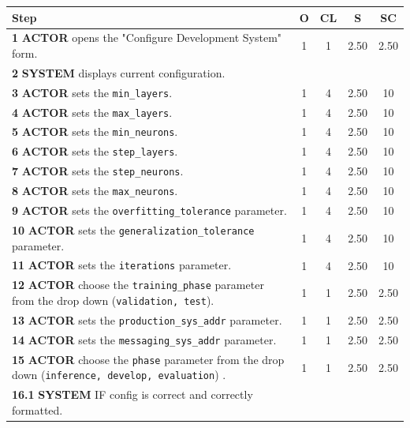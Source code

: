 \begin{table}[H]
    \centering
    \begin{tabularx}{\textwidth}{|X|c|c|c|c|}
    \hline
    \textbf{Step} & \textbf{O} & \textbf{CL} & \textbf{S} & \textbf{SC} \\
    \hline
    \textbf{1} \textbf{ACTOR} opens the "Configure Development System" form. & 1 & 1 & 2.50 & 2.50\\
    \hline
    \textbf{2} \textbf{SYSTEM} displays current configuration. & & & & \\
    \hline
    \textbf{3} \textbf{ACTOR} sets the \texttt{min\_layers}. & 1 & 4 & 2.50 & 10 \\
    \hline
    \textbf{4} \textbf{ACTOR} sets the \texttt{max\_layers}. & 1 & 4 & 2.50 & 10 \\
    \hline
    \textbf{5} \textbf{ACTOR} sets the \texttt{min\_neurons}. & 1 & 4 & 2.50 & 10 \\
    \hline
    \textbf{6} \textbf{ACTOR} sets the \texttt{step\_layers}. & 1 & 4 & 2.50 & 10 \\
    \hline
    \textbf{7} \textbf{ACTOR} sets the \texttt{step\_neurons}. & 1 & 4 & 2.50 & 10 \\
    \hline
    \textbf{8} \textbf{ACTOR} sets the \texttt{max\_neurons}. & 1 & 4 & 2.50 & 10 \\
    \hline
    \textbf{9} \textbf{ACTOR} sets the \texttt{overfitting\_tolerance} parameter. & 1 & 4 & 2.50 & 10 \\
    \hline
    \textbf{10} \textbf{ACTOR} sets the \texttt{generalization\_tolerance} parameter. & 1 & 4 & 2.50 & 10 \\
    \hline
    \textbf{11} \textbf{ACTOR} sets the \texttt{iterations} parameter. & 1 & 4 & 2.50 & 10 \\
    \hline
    \textbf{12} \textbf{ACTOR} choose the \texttt{training\_phase} parameter from the drop down (\texttt{validation, test}). & 1 & 1 & 2.50 & 2.50\\
    \hline
    \textbf{13} \textbf{ACTOR} sets the \texttt{production\_sys\_addr} parameter. & 1 & 1 & 2.50 & 2.50 \\
    \hline
    \textbf{14} \textbf{ACTOR} sets the \texttt{messaging\_sys\_addr} parameter. & 1 & 1 & 2.50 & 2.50 \\
    \hline
    \textbf{15} \textbf{ACTOR} choose the \texttt{phase} parameter from the drop down (\texttt{inference, develop, evaluation}) . & 1 & 1 & 2.50 & 2.50 \\
    \hline
    \textbf{16.1} \textbf{SYSTEM} IF config is correct and correctly formatted. & & & & \\

\end{tabularx}
\end{table}
